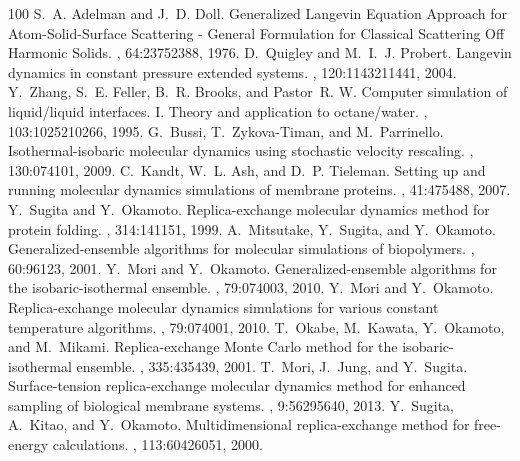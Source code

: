 \documentclass[a4paper,11pt,oneside,english]{sphinxmanual}
\begin{document}
\begin{sphinxthebibliography}{100}
S. A. Adelman and J. D. Doll. Generalized Langevin Equation Approach for Atom-Solid-Surface Scattering - General Formulation for Classical Scattering Off Harmonic Solids. , 64:2375\textendash{}2388, 1976.
D. Quigley and M. I. J. Probert. Langevin dynamics in constant pressure extended systems. , 120:11432\textendash{}11441, 2004.
Y. Zhang, S. E. Feller, B. R. Brooks, and Pastor R. W. Computer simulation of liquid/liquid interfaces. I. Theory and application to octane/water. , 103:10252\textendash{}10266, 1995.
G. Bussi, T. Zykova-Timan, and M. Parrinello. Isothermal-isobaric molecular dynamics using stochastic velocity rescaling. , 130:074101, 2009.
C. Kandt, W. L. Ash, and D. P. Tieleman. Setting up and running molecular dynamics simulations of membrane proteins. , 41:475\textendash{}488, 2007.
Y. Sugita and Y. Okamoto. Replica-exchange molecular dynamics method for protein folding. , 314:141\textendash{}151, 1999.
A. Mitsutake, Y. Sugita, and Y. Okamoto. Generalized-ensemble algorithms for molecular simulations of biopolymers. , 60:96\textendash{}123, 2001.
Y. Mori and Y. Okamoto. Generalized-ensemble algorithms for the isobaric-isothermal ensemble. , 79:074003, 2010.
Y. Mori and Y. Okamoto. Replica-exchange molecular dynamics simulations for various constant temperature algorithms. , 79:074001, 2010.
T. Okabe, M. Kawata, Y. Okamoto, and M. Mikami. Replica-exchange Monte Carlo method for the isobaric-isothermal ensemble. , 335:435\textendash{}439, 2001.
T. Mori, J. Jung, and Y. Sugita. Surface-tension replica-exchange molecular dynamics method for enhanced sampling of biological membrane systems. , 9:5629\textendash{}5640, 2013.
Y. Sugita, A. Kitao, and Y. Okamoto. Multidimensional replica-exchange method for free-energy calculations. , 113:6042\textendash{}6051, 2000.

\end{sphinxthebibliography}
\end{document}
